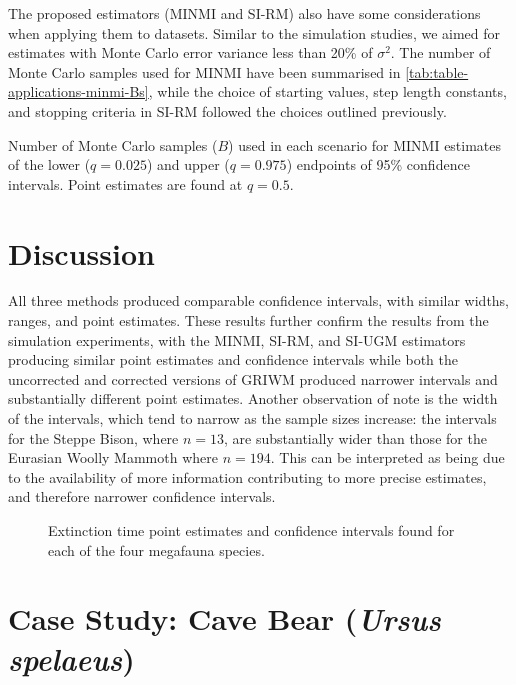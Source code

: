 The proposed estimators (MINMI and SI-RM) also have some considerations when applying them to datasets. Similar to the simulation studies, we aimed for estimates with Monte Carlo error variance less than 20\% of $\sigma^2$. The number of Monte Carlo samples used for MINMI have been summarised in \autoref{tab:table-applications-minmi-Bs}, while the choice of starting values, step length constants, and stopping criteria in SI-RM followed the choices outlined previously.
\begin{table}[ht]
    \centering
    \caption{Number of Monte Carlo samples ($B$) used in each scenario for MINMI estimates of the lower ($q=0.025$) and upper ($q=0.975$) endpoints of 95\% confidence intervals. Point estimates are found at $q = 0.5$.}
    \vspace{4mm}
    
    \label{tab:table-applications-minmi-Bs}
\end{table}

\section{Discussion}
All three methods produced comparable confidence intervals, with similar widths, ranges, and point estimates. These results further confirm the results from the simulation experiments, with the MINMI, SI-RM, and SI-UGM estimators producing similar point estimates and confidence intervals while both the uncorrected and corrected versions of GRIWM produced narrower intervals and substantially different point estimates. Another observation of note is the width of the intervals, which tend to narrow as the sample sizes increase: the intervals for the Steppe Bison, where $n = 13$, are substantially wider than those for the Eurasian Woolly Mammoth where $n = 194$. This can be interpreted as being due to the availability of more information contributing to more precise estimates, and therefore narrower confidence intervals.
\begin{figure}[ht]
    \centering
    
    \caption{Extinction time point estimates and confidence intervals found for each of the four megafauna species.}
    \label{fig:applications-confidence-intervals}
\end{figure}

\section{Case Study: Cave Bear (\textit{Ursus spelaeus})}

